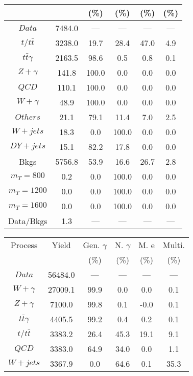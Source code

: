 \begin{figure}
\begin{minipage}[c]{0.32\textwidth}
{\begin{tabular}{cccccc}
 &  & (\%) & (\%) & (\%) & (\%)  \\
\hline
                                                                      $ Data $ &  7484.0 &  --- &  --- &  --- &  ---\\
$ t/t\bar{t} $ &  3238.0 &  19.7 &  28.4 &  47.0 &  4.9\\
$ t\bar{t}\gamma $ &  2163.5 &  98.6 &  0.5 &  0.8 &  0.1\\
$ Z+\gamma $ &  141.8 &  100.0 &  0.0 &  0.0 &  0.0\\
$ QCD $ &  110.1 &  100.0 &  0.0 &  0.0 &  0.0\\
$ W+\gamma $ &  48.9 &  100.0 &  0.0 &  0.0 &  0.0\\
$ Others $ &  21.1 &  79.1 &  11.4 &  7.0 &  2.5\\
$ W+jets $ &  18.3 &  0.0 &  100.0 &  0.0 &  0.0\\
$ DY+jets $ &  15.1 &  82.2 &  17.8 &  0.0 &  0.0\\
Bkgs &  5756.8 &  53.9 &  16.6 &  26.7 &  2.8\\
$ m_{T} = 800 $ &  0.2 &  0.0 &  100.0 &  0.0 &  0.0\\
$ m_{T} = 1200 $ &  0.0 &  0.0 &  100.0 &  0.0 &  0.0\\
$ m_{T} = 1600 $ &  0.0 &  0.0 &  100.0 &  0.0 &  0.0\\
Data/Bkgs &  1.3 &  --- &  --- &  --- &  ---\\
\hline
\end{tabular}
}
\end{minipage}
\begin{minipage}[c]{0.32\textwidth}
\centering
\tiny{
\begin{tabular}{cccccc}
\hline
Process & Yield & Gen. $\gamma$ & N. $\gamma$ & M. e & Multi. \\
 &  & (\%) & (\%) & (\%) & (\%)  \\
\hline
                                                                      $ Data $ &  56484.0 &  --- &  --- &  --- &  ---\\
$ W+\gamma $ &  27009.1 &  99.9 &  0.0 &  0.0 &  0.1\\
$ Z+\gamma $ &  7100.0 &  99.8 &  0.1 &  -0.0 &  0.1\\
$ t\bar{t}\gamma $ &  4405.5 &  99.2 &  0.4 &  0.2 &  0.1\\
$ t/t\bar{t} $ &  3383.2 &  26.4 &  45.3 &  19.1 &  9.1\\
$ QCD $ &  3383.0 &  64.9 &  34.0 &  0.0 &  1.1\\
$ W+jets $ &  3367.9 &  0.0 &  64.6 &  0.1 &  35.3\\

\end{tabular}}
\end{minipage}
\end{figure}
